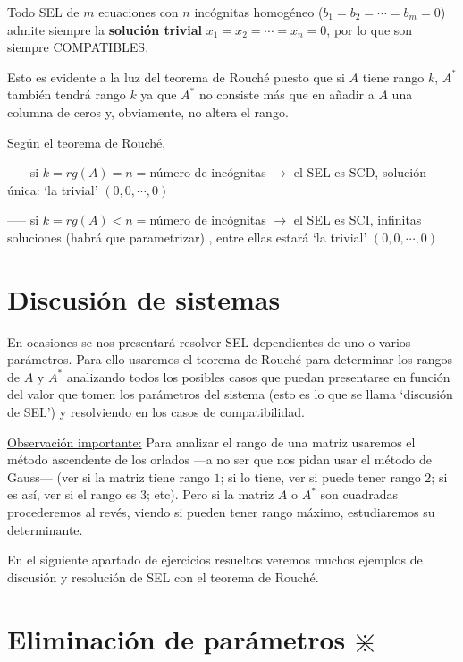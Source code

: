 Todo SEL de $m$ ecuaciones con $n$ incógnitas homogéneo ($b_1=b_2= \cdots = b_m=0$) admite siempre la  \textbf{solución trivial} $x_1=x_2= \cdots = x_n=0$, por lo que son siempre COMPATIBLES. 

Esto es evidente a la luz del teorema de Rouché puesto que si $A$ tiene rango $k$, $A^*$ también tendrá rango $k$ ya que $A^*$ no consiste más que en añadir a $A$ una columna de ceros y, obviamente, no altera el rango.

Según el teorema de Rouché, 

\hspace{2mm} ----- si $k=rg(A)=n=$número de incógnitas $\to $ el SEL es SCD, solución única: `la trivial' $(0,0, \cdots , 0)$

\hspace{2mm} -----  si $k=rg(A)<n=$número de incógnitas $\to $ el SEL es SCI,  infinitas soluciones (habrá que parametrizar) , entre ellas estará `la trivial' $(0,0, \cdots , 0)$


\section{Discusión de sistemas}

En ocasiones se nos presentará resolver SEL dependientes de uno o varios parámetros. Para ello usaremos el teorema de Rouché para determinar los rangos de $A$ y $A^*$ analizando todos los posibles casos que puedan presentarse en función del valor que tomen los parámetros del sistema (esto es lo que se llama `discusión de SEL') y resolviendo en los casos de compatibilidad.

\underline{Observación importante:} Para analizar el rango de una matriz usaremos el método ascendente de los orlados ---a no ser que nos pidan usar el método de Gauss--- (ver si la matriz tiene rango $1$; si lo tiene, ver si puede tener rango $2$; si es así, ver si el rango es $3$; etc). Pero si la matriz $A$ o $A^*$ son cuadradas procederemos al revés, viendo si pueden tener rango máximo, estudiaremos su determinante.

En el siguiente apartado de ejercicios resueltos veremos muchos ejemplos de discusión y resolución de SEL con el teorema de Rouché.


\section{Eliminación de parámetros $\divideontimes$}

